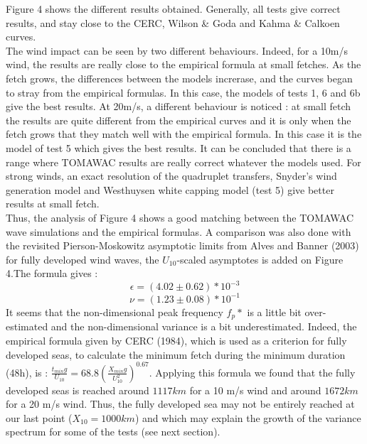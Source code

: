 \documentclass[10pt]{article}
\begin{document}
Figure 4 shows the different results obtained. Generally, all tests give correct results, and stay close to the CERC, Wilson \& Goda and Kahma \& Calkoen curves.\\
The wind impact can be seen by two different behaviours. Indeed, for a 10m/s wind, the results are really close to the empirical formula at small fetches. As the fetch grows, the differences between the models increrase, and the curves began to stray from the empirical formulas. In this case, the models of tests 1, 6 and 6b give the best results. At 20m/s, a different behaviour is noticed : at small fetch the results are quite different from the empirical curves and it is only when the fetch grows that they match well with the empirical formula. In this case it is the model of test 5 which gives the best results. It can be concluded that there is a range where TOMAWAC results are really correct whatever the models used. For strong winds, an exact resolution of the quadruplet transfers, Snyder's wind generation model and Westhuysen white capping model (test 5) give better results at small fetch. \\
Thus, the analysis of Figure 4 shows a good matching between the  TOMAWAC wave simulations and the empirical formulas. A comparison was also done with the revisited Pierson-Moskowitz asymptotic limits from Alves and Banner (2003) for fully developed wind waves, the $U_{10}$-scaled asymptotes is added on Figure 4.The formula gives : 
\[\epsilon = (4.02 \pm 0.62)*10^{-3}\]
\[\nu = (1.23 \pm 0.08)* 10^{-1}\]
 It seems that the non-dimensional peak frequency $f_p*$ is a little bit over-estimated and the non-dimensional variance is a bit underestimated. Indeed, the empirical formula given by CERC (1984), which is used as a criterion for fully developed seas, to calculate the minimum fetch during the minimum duration (48h), is : $\frac{t_{min} g}{U_{10}} = 68.8 (\frac{X_{min} g}{U_{10}^2})^{0.67}$. Applying this formula we found that the fully developed seas is reached around $1 117 km$ for a 10 m/s wind and around $1 672 km$ for a 20 m/s wind. Thus, the fully developed sea may not be entirely reached at our last point ($X_{10} = 1000km$) and which may explain the growth of the variance spectrum for some of the tests (see next section). 
\end{document}
